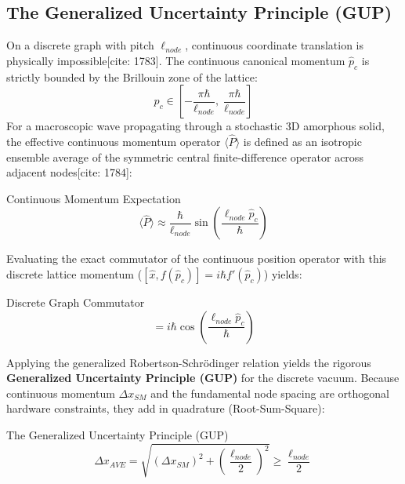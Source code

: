 \subsection{The Generalized Uncertainty Principle (GUP)}
On a discrete graph with pitch $\ell_{node}$, continuous coordinate translation is physically impossible[cite: 1783]. The continuous canonical momentum $\hat{p}_c$ is strictly bounded by the Brillouin zone of the lattice:
\begin{equation}
    p_c \in \left[-\frac{\pi\hbar}{\ell_{node}},\; \frac{\pi\hbar}{\ell_{node}}\right]
\end{equation}
For a macroscopic wave propagating through a stochastic 3D amorphous solid, the effective continuous momentum operator $\langle \hat{P} \rangle$ is defined as an isotropic ensemble average of the symmetric central finite-difference operator across adjacent nodes[cite: 1784]:
\begin{resultbox}{Continuous Momentum Expectation}
\begin{equation}
    \langle \hat{P} \rangle \approx \frac{\hbar}{\ell_{node}} \sin\left(\frac{\ell_{node} \hat{p}_c}{\hbar}\right)
\end{equation}
\end{resultbox}

Evaluating the exact commutator of the continuous position operator with this discrete lattice momentum ($[\hat{x}, f(\hat{p}_c)] = i\hbar f'(\hat{p}_c)$) yields:
\begin{resultbox}{Discrete Graph Commutator}
\begin{equation}
    [\hat{x}, \langle \hat{P} \rangle] = i\hbar \cos\left(\frac{\ell_{node} \hat{p}_c}{\hbar}\right)
\end{equation}
\end{resultbox}

Applying the generalized Robertson-Schr\"odinger relation yields the rigorous \textbf{Generalized Uncertainty Principle (GUP)} for the discrete vacuum. Because continuous momentum $\Delta x_{SM}$ and the fundamental node spacing are orthogonal hardware constraints, they add in quadrature (Root-Sum-Square):
\begin{resultbox}{The Generalized Uncertainty Principle (GUP)}
\begin{equation}
    \Delta x_{AVE} = \sqrt{(\Delta x_{SM})^2 + \left(\frac{\ell_{node}}{2}\right)^2} \ge \frac{\ell_{node}}{2}
\end{equation}
\end{resultbox}

